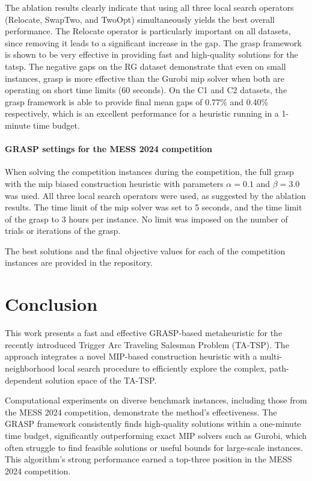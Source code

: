 \documentclass[twocolumn, switch]{article} %
\begin{document}
The ablation results clearly indicate that using all three local search operators (Relocate, SwapTwo, and TwoOpt) simultaneously yields the best overall performance.
The Relocate operator is particularly important on all datasets, since removing it leads to a significant increase in the gap.
The \gls{grasp} framework is shown to be very effective in providing fast and high-quality solutions for the \gls{tatsp}.
The negative gaps on the RG dataset demonstrate that even on small instances, \gls{grasp} is more effective than the Gurobi \gls{mip} solver when both are operating on short time limits (60 seconds).
On the C1 and C2 datasets, the \gls{grasp} framework is able to provide final mean gaps of 0.77\% and 0.40\% respectively, which is an excellent performance for a heuristic running in a 1-minute time budget.

\paragraph{GRASP settings for the MESS 2024 competition}
\label{sec:grasp_settings_for_competition}

When solving the competition instances during the competition, the full \gls{grasp} with the \gls{mip} biased construction heuristic with parameters $\alpha = 0.1$ and $\beta = 3.0$ was used.
All three local search operators were used, as suggested by the ablation results.
The time limit of the \gls{mip} solver was set to 5 seconds, and the time limit of the \gls{grasp} to 3 hours per instance.
No limit was imposed on the number of trials or iterations of the \gls{grasp}.

The best solutions and the final objective values for each of the competition instances are provided in the repository.

\section{Conclusion}
This work presents a fast and effective GRASP-based metaheuristic for the recently introduced Trigger Arc Traveling Salesman Problem (TA-TSP). The approach integrates a novel MIP-based construction heuristic with a multi-neighborhood local search procedure to efficiently explore the complex, path-dependent solution space of the TA-TSP.

Computational experiments on diverse benchmark instances, including those from the MESS 2024 competition, demonstrate the method’s effectiveness. The GRASP framework consistently finds high-quality solutions within a one-minute time budget, significantly outperforming exact MIP solvers such as Gurobi, which often struggle to find feasible solutions or useful bounds for large-scale instances. This algorithm’s strong performance earned a top-three position in the MESS 2024 competition.
\end{document}
